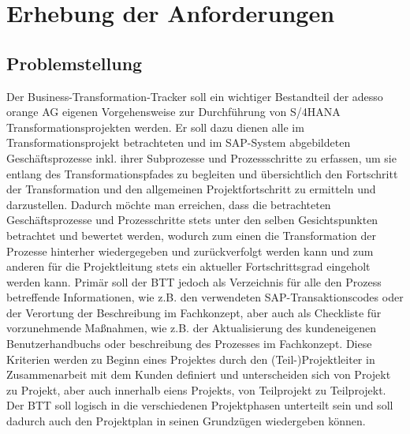 \section{Erhebung der Anforderungen}

\subsection{Problemstellung}
Der Business-Transformation-Tracker soll ein wichtiger Bestandteil der adesso orange AG eigenen Vorgehensweise zur Durchführung von S/4HANA Transformationsprojekten werden. Er soll dazu dienen alle im Transformationsprojekt betrachteten und im SAP-System abgebildeten Geschäftsprozesse inkl. ihrer Subprozesse und Prozessschritte zu erfassen, um sie entlang des Transformationspfades zu begleiten und übersichtlich den Fortschritt der Transformation und den allgemeinen Projektfortschritt zu ermitteln und darzustellen. Dadurch möchte man erreichen, dass die betrachteten Geschäftsprozesse und Prozesschritte stets unter den selben Gesichtspunkten betrachtet und bewertet werden, wodurch zum einen die Transformation der Prozesse hinterher wiedergegeben und zurückverfolgt werden kann und zum anderen für die Projektleitung stets ein aktueller Fortschrittsgrad eingeholt werden kann. Primär soll der BTT jedoch als Verzeichnis für alle den Prozess betreffende Informationen, wie z.B. den verwendeten SAP-Transaktionscodes oder der Verortung der Beschreibung im Fachkonzept, aber auch als Checkliste für vorzunehmende Maßnahmen, wie z.B. der Aktualisierung des kundeneigenen Benutzerhandbuchs oder beschreibung des Prozesses im Fachkonzept. Diese Kriterien werden zu Beginn eines Projektes durch den (Teil-)Projektleiter in Zusammenarbeit mit dem Kunden definiert und unterscheiden sich von Projekt zu Projekt, aber auch innerhalb eiens Projekts, von Teilprojekt zu Teilprojekt. Der BTT soll logisch in die verschiedenen Projektphasen unterteilt sein und soll dadurch auch den Projektplan in seinen Grundzügen wiedergeben können.


